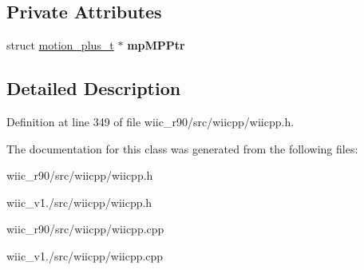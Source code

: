 \subsection*{Private Attributes}
\begin{DoxyCompactItemize}
\item 
\hypertarget{class_c_motion_plus_a46694dd1b83b1945924376d1c2866729}{struct \hyperlink{structmotion__plus__t}{motion\-\_\-plus\-\_\-t} $\ast$ {\bfseries mp\-M\-P\-Ptr}}\label{class_c_motion_plus_a46694dd1b83b1945924376d1c2866729}

\end{DoxyCompactItemize}


\subsection{Detailed Description}


Definition at line 349 of file wiic\-\_\-r90/src/wiicpp/wiicpp.\-h.



The documentation for this class was generated from the following files\-:\begin{DoxyCompactItemize}
\item 
wiic\-\_\-r90/src/wiicpp/wiicpp.\-h\item 
wiic\-\_\-v1./src/wiicpp/wiicpp.\-h\item 
wiic\-\_\-r90/src/wiicpp/wiicpp.\-cpp\item 
wiic\-\_\-v1./src/wiicpp/wiicpp.\-cpp\end{DoxyCompactItemize}
